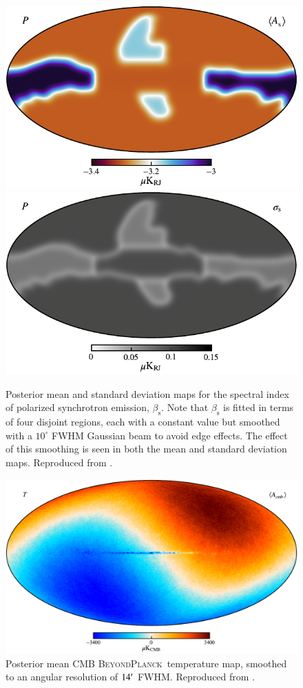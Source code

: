\documentclass[twocolumn]{aa}
\newcommand{\BP}{\textsc{BeyondPlanck}}
\begin{document}
\begin{figure}[t]
  \center
  \includegraphics[width=0.49\linewidth]{figs/BP_synch_v2_QU_BETA_MEAN_w12_n1024_cb_c-fusion.pdf}
  \includegraphics[width=0.49\linewidth]{figs/BP_synch_v2_QU_BETA_STDDEV_w12_n1024_cb_c-neutral_r.pdf}
  \caption{Posterior mean and standard deviation maps for the spectral
    index of polarized synchrotron emission,
    $\beta_{\mathrm{s}}$. Note that $\beta_{\mathrm{s}}$ is fitted in
    terms of four disjoint regions, each with a constant value but
    smoothed with a $10^{\circ}$ FWHM Gaussian beam to avoid edge
    effects. The effect of this smoothing is seen in both the mean and
    standard deviation maps. Reproduced from \citet{bp14}.}\label{fig:synch_beta_pol}

  \center
  \includegraphics[width=0.9\linewidth]{figs/BP_cmb_v2_I_MEAN_w18_n1024_cb_c-planck.pdf}
  \caption{Posterior mean CMB \BP\ temperature map, smoothed to an
    angular resolution of $14\arcm$ FWHM. Reproduced from \citet{bp11}.}\label{fig:cmb_with_dipole}
\end{figure}
\end{document}
